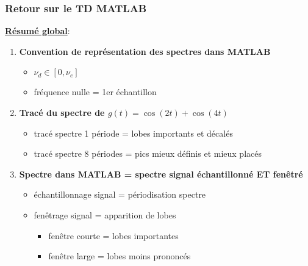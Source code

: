 \documentclass{beamer}
\begin{document}
\begin{frame}
\frametitle{Retour sur le TD MATLAB}
\textbf{\underline{Résumé global}}:
\vspace{0.2cm}
\begin{enumerate}
\item \textbf{Convention de représentation des spectres dans MATLAB} 
\begin{itemize}
\item $\nu_d \in [0, \nu_e]$
\vspace{0.15cm}
\item fréquence nulle = 1er échantillon
\end{itemize}
\vspace{0.2cm}
\item \textbf{Tracé du spectre de $g(t) = \cos(2t)+\cos(4t)$}
\begin{itemize}
\item tracé spectre 1 période = lobes importants et décalés
\vspace{0.15cm}
\item tracé spectre 8 périodes = pics mieux définis et mieux placés 
\end{itemize}
\vspace{0.2cm}
\item \textbf{Spectre dans MATLAB = spectre signal échantillonné ET fenêtré}
\begin{itemize}
\item échantillonnage signal = périodisation spectre
\vspace{0.15cm}
\item fenêtrage signal = apparition de lobes 
\begin{itemize}
\vspace{0.15cm}
\item fenêtre courte = lobes importantes
\vspace{0.15cm}
\item fenêtre large = lobes moins prononcés
\end{itemize}
\end{itemize}
\end{enumerate}
\end{frame}
\end{document}
